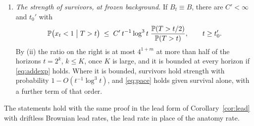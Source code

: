 \begin{theorem}
\begin{enumerate}[label=\emph{(\roman*)},itemsep=1pt]
$\E[O_t]/t\to\tfrac14$.
\item \emph{The strength of survivors, at frozen background.} If
$B_t\equiv B$, there are $C'<\infty$ and $t_0'$ with
\begin{equation}\label{eq:pacestrength}
\mathbb{P}\bigl(x_t<1\bigm|T>t\bigr)\;\le\;C'\,t^{-1}\log^3t\;
\frac{\mathbb{P}(T>t/2)}{\mathbb{P}(T>t)},\qquad t\ge t_0'.
\end{equation}
By (ii) the ratio on the right is at most $4^{1+m}$ at more than half of
the horizons $t=2^k$, $k\le K$, once $K$ is large, and it is bounded at
every horizon if \eqref{eq:addexp} holds. Where it is bounded, survivors
hold strength with probability $1-O(t^{-1}\log^3t)$, and \eqref{eq:pace}
holds given survival alone, with a further term of that order.
\end{enumerate}
The statements hold with the same proof in the lead form of
Corollary~\ref{cor:lead} with driftless Brownian lead rates, the lead
rate in place of the anatomy rate.
\end{theorem}

